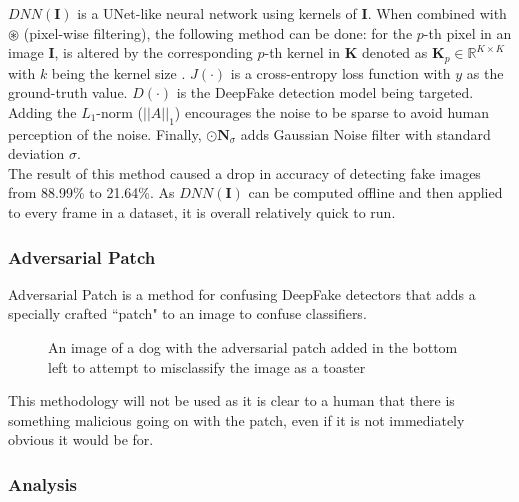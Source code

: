 \documentclass{article}
\begin{document}
$DNN(\mathbf{I})$ is a UNet-like neural network using kernels of $\mathbf{I}$. When combined with $\circledast$ (pixel-wise filtering), the following method can be done: for the $p$-th pixel in an image $\mathbf{I}$, is altered by the corresponding $p$-th kernel in $\mathbf{K}$ denoted as $\textbf{K}_p \in \mathbb{R}^{K \times K}$ with $k$ being the kernel size \cite{huang2020fakeretouch}. $J(\cdot)$ is a cross-entropy loss function with $y$ as the ground-truth value. $D(\cdot)$ is the DeepFake detection model being targeted. Adding the $L_1$-norm ($||A||_1$) encourages the noise to be sparse to avoid human perception of the noise. Finally, $\odot \mathbf{N}_\sigma$ adds Gaussian Noise filter with standard deviation $\sigma$. \\

The result of this method caused a drop in accuracy of detecting fake images from 88.99\% to 21.64\%. As $DNN(\mathbf{I})$ can be computed offline and then applied to every frame in a dataset, it is overall relatively quick to run.

\subsubsection{Adversarial Patch}

Adversarial Patch is a method for confusing DeepFake detectors that adds a specially crafted ``patch" to an image to confuse classifiers\cite{brown2017adversarial}.

\begin{figure}[H]
    \centering
    \caption{An image of a dog with the adversarial patch added in the bottom left to attempt to misclassify the image as a toaster\cite{brown2017adversarial}}
\end{figure}

This methodology will not be used as it is clear to a human that there is something malicious going on with the patch, even if it is not immediately obvious it would be for.

\subsubsection{Analysis}
\end{document}
